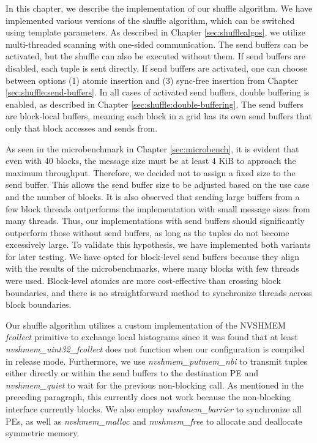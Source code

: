 In this chapter, we describe the implementation of our shuffle algorithm.
We have implemented various versions of the shuffle algorithm, which can be switched using template parameters. As described in Chapter \ref{sec:shufflealgos}, we utilize multi-threaded scanning with one-sided communication. The send buffers can be activated, but the shuffle can also be executed without them. If send buffers are disabled, each tuple is sent directly. If send buffers are activated, one can choose between options (1) atomic insertion and (3) sync-free insertion from Chapter \ref{sec:shuffle:send-buffers}. In all cases of activated send buffers, double buffering is enabled, as described in Chapter \ref{sec:shuffle:double-buffering}. The send buffers are block-local buffers, meaning each block in a grid has its own send buffers that only that block accesses and sends from. 

As seen in the microbenchmark in Chapter \ref{sec:microbench}, it is evident that even with 40 blocks, the message size must be at least 4 KiB to approach the maximum throughput. Therefore, we decided not to assign a fixed size to the send buffer. This allows the send buffer size to be adjusted based on the use case and the number of blocks. It is also observed that sending large buffers from a few block threads outperforms the implementation with small message sizes from many threads. Thus, our implementations with send buffers should significantly outperform those without send buffers, as long as the tuples do not become excessively large. To validate this hypothesis, we have implemented both variants for later testing. We have opted for block-level send buffers because they align with the results of the microbenchmarks, where many blocks with few threads were used. Block-level atomics are more cost-effective than crossing block boundaries, and there is no straightforward method to synchronize threads across block boundaries.

Our shuffle algorithm utilizes a custom implementation of the NVSHMEM \textit{fcollect} primitive to exchange local histograms since it was found that at least \textit{nvshmem\_uint32\_fcollect} does not function when our configuration is compiled in release mode. Furthermore, we use \textit{nvshmem\_putmem\_nbi} to transmit tuples either directly or within the send buffers to the destination PE and \textit{nvshmem\_quiet} to wait for the previous non-blocking call. As mentioned in the preceding paragraph, this currently does not work because the non-blocking interface currently blocks. We also employ \textit{nvshmem\_barrier} to synchronize all PEs, as well as \textit{nvshmem\_malloc} and \textit{nvshmem\_free} to allocate and deallocate symmetric memory.


